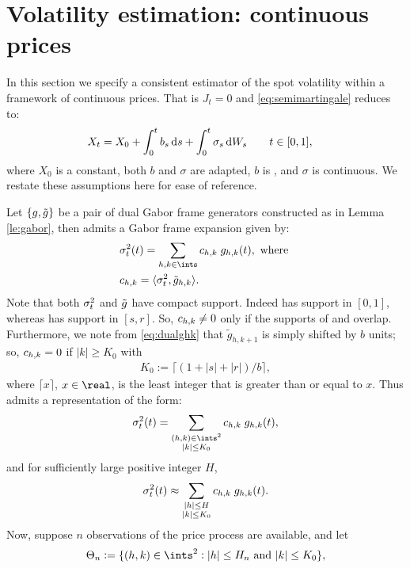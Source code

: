\section{Volatility estimation: continuous prices } \label{sec:estimator}
In this section we specify a consistent estimator of the spot volatility within a framework of continuous prices. That is $J_t = 0$ and \eqref{eq:semimartingale} reduces to:
\begin{align}
  X_t & = X_0 + \int_0^t b_s \D s + \int_0^t \sigma_s \D W_s    \qquad t \in [0,1] 
  \label{eq:contsemimartingale},
\end{align}
where $X_0$ is a constant, both $b$ and $\sigma$ are adapted, $b$ is \cadlag, and $\sigma$ is continuous.    We restate these assumptions here for ease of reference.

Let $\{g, \tilde{g}\}$ be a pair of dual Gabor frame generators constructed as in Lemma \ref{le:gabor}, then   \sv admits a Gabor frame expansion given by:  
\begin{align}
  &\sv(t)  = \sum_{h,k \in \ints} \chk \;g_{h,k}(t), \text{ where } 
\\
&\chk = \langle \sv, \tilde{g}_{h,k} \rangle. \label{eq:chk}
\end{align}
Note that both $\sigma_t^2$ and $\tilde{g}$ have compact support. Indeed \sv has support in $[0,1]$, whereas  \tg has support in $[s,r]$. So, ${c}_{h,k} \ne 0$ only if  the supports of \sv and \tghk overlap.  Furthermore, we note from \eqref{eq:dualghk} that $\tilde{g}_{h,k+1}$ is simply \tghk shifted by $b$ units; so, ${c}_{h,k} = 0$ if $|k| \ge K_0$ with 
\begin{align}
  K_0:= \lceil ( 1 + |s| + |r|)/b \rceil,
\end{align}
where $\lceil x\rceil$, $x \in \real$, is the least  integer that is greater than or equal to   $x$.  Thus \sv admits a  representation of the form: 
\begin{align}
  \sv(t) =  \sum_{\substack{(h,k) \in \ints^2\\\vert k \vert \le K_0}} \chk\;g_{h,k}(t) ,\notag
\end{align}
and  for sufficiently large positive integer $H$, 
 \begin{align}
 \sigma_t^2(t) \approx \sum_{\substack{\vert h \vert \le H \\\vert k \vert \le K_0}} {c}_{h,k}\;g_{h,k}(t). \notag
  \notag
   \label{}
 \end{align}
 Now, suppose $n$ observations of the price process are available, and let 
\begin{align}
  \Theta_n := \{(h,k) \in \ints^2 : |h| \le H_n \text{ and }|k| \le K_0\},
  \label{eq:theta}
\end{align}
